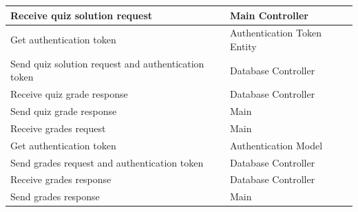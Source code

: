 \documentclass[]{article}
\begin{document}
\begin{enumerate}[a)]
\begin{table}[H]
\begin{tabular}{|p{5cm}|p{5cm}|}
		\hline
		Receive quiz solution request & Main Controller \\
		\hline
		Get authentication token & Authentication Token Entity \\
		\hline
		Send quiz solution request and authentication token & Database Controller \\
		\hline
		Receive quiz grade response & Database Controller \\
		\hline
		Send quiz grade response & Main \\
		\hline
		Receive grades request & Main \\
		\hline
		Get authentication token & Authentication Model \\
		\hline
		Send grades request and authentication token & Database Controller \\
		\hline
		Receive grades response & Database Controller \\
		\hline
		Send grades response & Main \\
		\hline
		\end{tabular}
	\end{table}



\end{enumerate}
\end{document}
